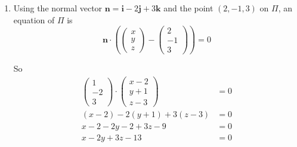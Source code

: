 \documentclass[leqno]{article}
\begin{document}
\begin{enumerate}[
  label=\textbf{\arabic*.},
  leftmargin=*,
  topsep=0pt,
  partopsep=0pt,
  parsep=0pt
]
\begin{djsSolution}
\begin{enumerate}[label=\textbf{(\alph*)}]
  The plane \(\Pi\) has direction vectors
  \[
  \begin{pmatrix}1\\2\\1\end{pmatrix}
  \quad \text{and} \quad
  \begin{pmatrix}4\\-1\\-2\end{pmatrix}
  \]
  
  Check the scalar products:
  \[
  \mathbf n\cdot \begin{pmatrix}1\\2\\1\end{pmatrix}
  =1(1)+(-2)(2)+3(1)
  =1-4+3
  =0
  \]
  \[
  \mathbf n\cdot \begin{pmatrix}4\\-1\\-2\end{pmatrix}
  =1(4)+(-2)(-1)+3(-2)
  =4+2-6
  =0
  \]
  
  Since \(\mathbf n\) is perpendicular to both direction vectors of the plane, \(\mathbf n\) is perpendicular to \(\Pi\).
  
  Therefore \(\mathbf i-2\mathbf j+3\mathbf k\) is perpendicular to \(\Pi\).

  \item Using the normal vector \(\mathbf n=\mathbf i-2\mathbf j+3\mathbf k\) and the point \((2,-1,3)\) on \(\Pi\), an equation of \(\Pi\) is
  \[
  \mathbf n\cdot \left(\begin{pmatrix}x\\y\\z\end{pmatrix}-\begin{pmatrix}2\\-1\\3\end{pmatrix}\right)=0
  \]
  
  So
  \begin{align*}
  \begin{pmatrix}1\\-2\\3\end{pmatrix}\cdot \begin{pmatrix}x-2\\y+1\\z-3\end{pmatrix} &= 0\\
  (x-2)-2(y+1)+3(z-3) &= 0\\
  x-2-2y-2+3z-9 &= 0\\
  x-2y+3z-13 &= 0
  \end{align*}
  

\end{enumerate}
\end{djsSolution}
\end{enumerate}
\end{document}
